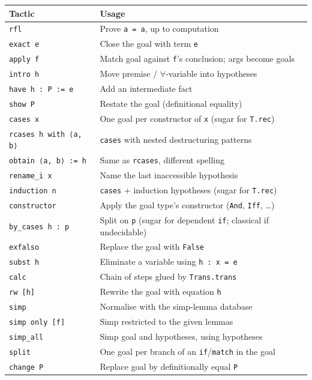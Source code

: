 \documentclass[12pt, a4paper, openright]{book}
\theoremstyle{thmstyle}
\theoremstyle{defstyle}
\newcommand{\lc}[1]{\texttt{#1}}
\begin{document}
\begin{table}[H]
  \centering
  \small
  \begin{tabular}{ll}
    \toprule
    Tactic & Usage \\
    \midrule
    \lc{rfl}          & Prove \lc{a = a}, up to computation \\
    \lc{exact e}      & Close the goal with term \lc{e} \\
    \lc{apply f}      & Match goal against \lc{f}'s conclusion; args become goals \\
    \lc{intro h}      & Move premise / $\forall$-variable into hypotheses \\
    \lc{have h : P := e} & Add an intermediate fact \\
    \lc{show P}       & Restate the goal (definitional equality) \\
    \lc{cases x}      & One goal per constructor of \lc{x} (sugar for \lc{T.rec}) \\
    \lc{rcases h with ⟨a, b⟩} & \lc{cases} with nested destructuring patterns \\
    \lc{obtain ⟨a, b⟩ := h}   & Same as \lc{rcases}, different spelling \\
    \lc{rename\_i x}  & Name the last inaccessible hypothesis \\
    \lc{induction n}  & \lc{cases} + induction hypotheses (sugar for \lc{T.rec}) \\
    \lc{constructor}  & Apply the goal type's constructor (\lc{And}, \lc{Iff}, …) \\
    \lc{by\_cases h : p} & Split on \lc{p} (sugar for dependent \lc{if}; classical if undecidable) \\
    \lc{exfalso}      & Replace the goal with \lc{False} \\
    \lc{subst h}      & Eliminate a variable using \lc{h : x = e} \\
    \lc{calc}         & Chain of steps glued by \lc{Trans.trans} \\
    \lc{rw [h]}       & Rewrite the goal with equation \lc{h} \\
    \lc{simp}         & Normalise with the simp-lemma database \\
    \lc{simp only [f]}& Simp restricted to the given lemmas \\
    \lc{simp\_all}    & Simp goal and hypotheses, using hypotheses \\
    \lc{split}        & One goal per branch of an \lc{if}/\lc{match} in the goal \\
    \lc{change P}     & Replace goal by definitionally equal \lc{P} \\

\end{tabular}
\end{table}
\end{document}
